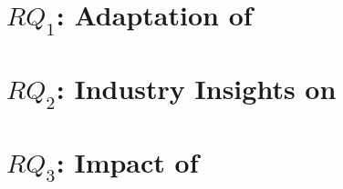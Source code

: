 \section{$RQ_1$: Adaptation of \EPS} 
%

%
%
%
%
%
%
%
%

\section{$RQ_2$: Industry Insights on \EPS} 


\section{$RQ_3$: Impact of \EPS} 









